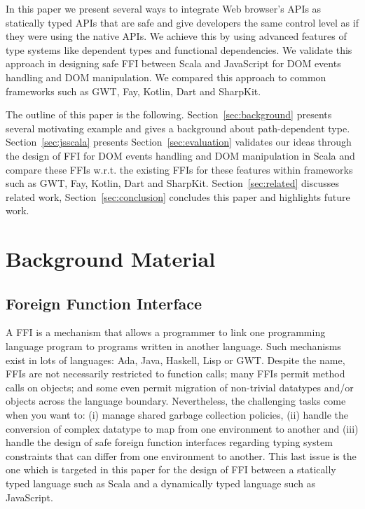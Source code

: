 \documentclass[runningheads,a4paper]{llncs}
\begin{document}
In this paper we present several ways to integrate Web browser’s APIs as statically typed APIs that
are safe and give developers the same control level as if they were using the native APIs. We
achieve this by using advanced features of type systems like dependent types and functional
dependencies. We validate this approach in designing safe FFI between Scala and JavaScript for DOM
events handling and DOM manipulation. We compared this approach to common frameworks such as GWT,
Fay, Kotlin, Dart and SharpKit.


The outline of this paper is the following.
Section~\ref{sec:background} presents several motivating example and gives a background about
path-dependent type.
Section~\ref{sec:jsscala} presents %
Section~\ref{sec:evaluation} validates our ideas through the design of FFI for DOM events handling
and DOM manipulation in Scala and compare these FFIs w.r.t. the existing FFIs for these features
within frameworks such as GWT, Fay, Kotlin, Dart and SharpKit.
Section~\ref{sec:related} discusses related work, Section~\ref{sec:conclusion} concludes this paper
and highlights  future work. 


\section{Background Material}

\subsection{Foreign Function Interface}

A FFI is a mechanism that allows a programmer to link one programming language program to programs
written in another language. Such mechanisms exist in lots of languages: Ada, Java, Haskell, Lisp or
GWT. Despite the name, FFIs are not necessarily restricted to function calls; many FFIs permit
method calls on objects; and some even permit migration of non-trivial datatypes and/or objects
across the language boundary. Nevertheless, the challenging tasks come when you want to: (i) manage
shared garbage collection policies, (ii) handle the conversion of complex datatype to map from one
environment to another and (iii) handle the design of safe foreign function interfaces regarding
typing system constraints that can differ from one environment to another. This last issue is the
one which is targeted in this paper for the design of FFI between a statically typed language such
as Scala and a dynamically typed language such as JavaScript.
\end{document}
